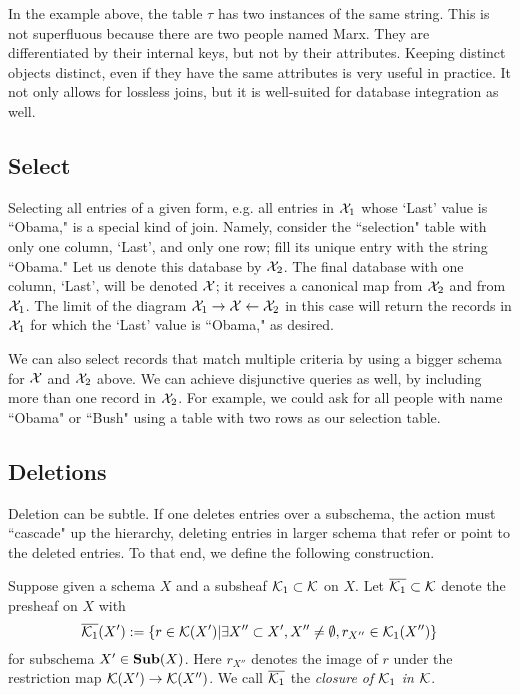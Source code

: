 \documentclass{amsart}
\begin{document}
In the example above, the table $\tau$ has two instances of the same string.  This is not superfluous because there are two people named Marx.  They are differentiated by their internal keys, but not by their attributes.  Keeping distinct objects distinct, even if they have the same attributes is very useful in practice.  It not only allows for lossless joins, but it is well-suited for database integration as well.

\subsection{Select}\label{subsec:select}

Selecting all entries of a given form, e.g. all entries in $\mathcal{X}_1$ whose `Last' value is ``Obama," is a special kind of join.  Namely, consider the ``selection" table with only one column, `Last', and only one row; fill its unique entry with the string ``Obama."  Let us denote this database by $\mathcal{X}_2$.  The final database with one column, `Last', will be denoted $\mathcal{X}$; it receives a canonical map from $\mathcal{X}_2$ and from $\mathcal{X}_1$.  The limit of the diagram $\mathcal{X}_1\rightarrow\mathcal{X}\leftarrow\mathcal{X}_2$ in this case will return the records in $\mathcal{X}_1$ for which the `Last' value is ``Obama," as desired.

We can also select records that match multiple criteria by using a bigger schema for $\mathcal{X}$ and $\mathcal{X}_2$ above.  We can achieve disjunctive queries as well, by including more than one record in $\mathcal{X}_2$.  For example, we could ask for all people with name ``Obama" or ``Bush" using a table with two rows as our selection table. 

\subsection{Deletions}\label{subsec:delete}

Deletion can be subtle.  If one deletes entries over a subschema, the action must ``cascade" up the hierarchy, deleting entries in larger schema that refer or point to the deleted entries.  To that end, we define the following construction.  

\begin{definition}

Suppose given a schema $X$ and a subsheaf $\mathcal{K}_1\subset\mathcal{K}$ on $X$.  Let $\overline{\mathcal{K}_1}\subset\mathcal{K}$ denote the presheaf on $X$ with $$\overline{\mathcal{K}_1}(X'):=\{r\in\mathcal{K}(X')|\exists X''\subset X', X''\neq\emptyset, r_{X''}\in\mathcal{K}_1(X'')\}$$ for subschema $X'\in{\bf Sub}(X)$.  Here $r_{X''}$ denotes the image of $r$ under the restriction map $\mathcal{K}(X')\rightarrow\mathcal{K}(X'')$.  We call $\overline{\mathcal{K}_1}$ the {\em closure of $\mathcal{K}_1$ in $\mathcal{K}$}.

\end{definition}
\end{document}
